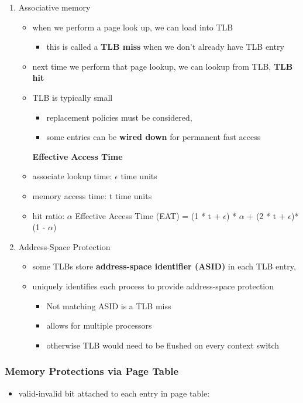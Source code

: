 \documentclass[11pt]{article}
\begin{document}
\begin{enumerate}
\item Associative memory
\label{sec:org6ca9e6c}
\begin{itemize}
\item when we perform a page look up, we can load into TLB
\begin{itemize}
\item this is called a \textbf{TLB miss} when we don't already have TLB entry
\end{itemize}
\item next time we perform that page lookup, we can lookup from TLB, \textbf{TLB hit}
\item TLB is typically small
\begin{itemize}
\item replacement policies must be considered,
\item some entries can be \textbf{wired down} for permanent fast access
\end{itemize}
\textbf{Effective Access Time}
\item associate lookup time: \(\epsilon\) time units
\item memory access time: t time units
\item hit ratio: \(\alpha\)
Effective Access Time (EAT) =
  (1 * t + \(\epsilon\)) * \(\alpha\) + (2 * t + \(\epsilon\))*(1 - \(\alpha\))
\end{itemize}
\item Address-Space Protection
\label{sec:org3314a89}
\begin{itemize}
\item some TLBs store \textbf{address-space identifier (ASID)} in each TLB entry,
\item uniquely identifies each process to provide address-space protection
\begin{itemize}
\item Not matching ASID is a TLB miss
\item allows for multiple processors
\item otherwise TLB would need to be flushed on every context switch
\end{itemize}
\end{itemize}
\end{enumerate}
\subsubsection{Memory Protections via Page Table}
\label{sec:org5c7bd34}
\begin{itemize}
\item valid-invalid bit attached to each entry in page table:
\end{itemize}
\end{document}

